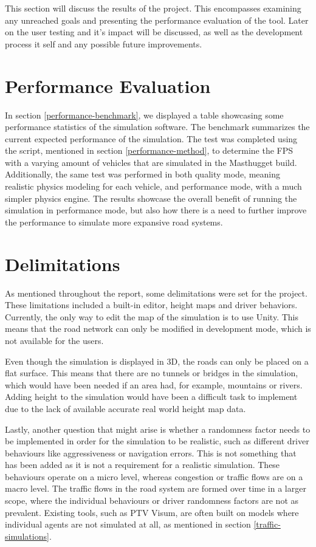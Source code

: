 
This section will discuss the results of the project. This encompasses examining any unreached goals and presenting the performance evaluation of the tool. Later on the user testing and it's impact will be discussed, as well as the development process it self and any possible future improvements.

\section{Performance Evaluation}
    In section \ref{performance-benchmark}, we displayed a table showcasing some performance statistics of the simulation software. The benchmark summarizes the current expected performance of the simulation. The test was completed using the script, mentioned in section \ref{performance-method}, to determine the FPS with a varying amount of vehicles that are simulated in the Masthugget build. Additionally, the same test was performed in both quality mode, meaning realistic physics modeling for each vehicle, and performance mode, with a much simpler physics engine. The results showcase the overall benefit of running the simulation in performance mode, but also how there is a need to further improve the performance to simulate more expansive road systems.

\section{Delimitations}
    As mentioned throughout the report, some delimitations were set for the project. These limitations included a built-in editor, height maps and driver behaviors. Currently, the only way to edit the map of the simulation is to use Unity. This means that the road network can only be modified in development mode, which is not available for the users.

    Even though the simulation is displayed in 3D, the roads can only be placed on a flat surface. This means that there are no tunnels or bridges in the simulation, which would have been needed if an area had, for example, mountains or rivers. Adding height to the simulation would have been a difficult task to implement due to the lack of available accurate real world height map data.

    Lastly, another question that might arise is whether a randomness factor needs to be implemented in order for the simulation to be realistic, such as different driver behaviours like aggressiveness or navigation errors. This is not something that has been added as it is not a requirement for a realistic simulation. These behaviours operate on a micro level, whereas congestion or traffic flows are on a macro level. The traffic flows in the road system are formed over time in a larger scope, where the individual behaviours or driver randomness factors are not as prevalent. Existing tools, such as PTV Visum, are often built on models where individual agents are not simulated at all, as mentioned in section \ref{traffic-simulations}.

